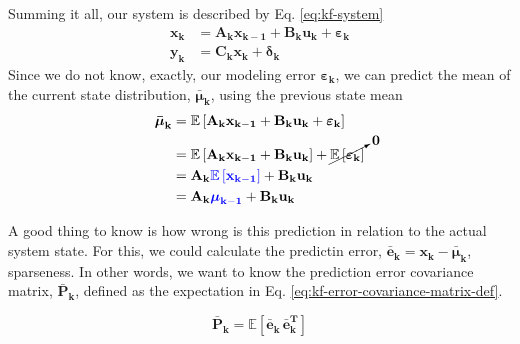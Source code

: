 \documentclass[12pt]{article}
\newcommand{\bvec}[1]{\mathbf{#1}} %
\newcommand{\bvecT}[1]{\mathbf{#1^T}} %
\newcommand{\mat}[1]{\mathbf{#1}}
\newcommand{\brac}[1]{\left[#1\right]} %
\newcommand{\mb}[1]{{\boldsymbol{#1}}} %
\newcommand{\expv}[1]{\mathbb{E}\brac{#1}} %
\newcommand{\blue}[1]{\color{blue}#1\color{black}}
\begin{document}
Summing it all, our system is described by Eq. \ref{eq:kf-system}
\begin{equation}
    \begin{aligned}
        \bvec{x_k} &= \mat{A_k}\bvec{x_{k-1}} + \mat{B_k}\bvec{u_k} + \mb{\varepsilon}_\mathbf{k}\\
        \bvec{y_k} &= \mat{C_k}\bvec{x_k} + \mb{\delta}_\mathbf{k}
    \end{aligned}
    \label{eq:kf-system}
\end{equation}
Since we do not know, exactly, our modeling error $\mb{\varepsilon}_\mathbf{k}$, we can predict the mean of the current state distribution, $\mb{\bar{\mu}}_\mathbf{k}$, using the previous state mean
\begin{equation}
    \begin{aligned}
        \mb{\bar{\mu}}_\mathbf{k} &= \expv{\mat{A_k}\bvec{x_{k-1}} + \mat{B_k}\bvec{u_k} + \mb{\varepsilon}_\mathbf{k}}\\
        & = \expv{\mat{A_k}\bvec{x_{k-1}} + \mat{B_k}\bvec{u_k}} + \cancelto{\mat{0}}{\expv{\mb{\varepsilon}_\mathbf{k}}}\\
        &= \mat{A_k}\blue{\expv{\bvec{x_{k-1}}}} + \mat{B_k}\bvec{u_k}\\
        &= \mat{A_k}\blue{\mb{\mu}_\mathbf{k-1}} + \mat{B_k}\bvec{u_k}
    \end{aligned}
    \label{eq:kf-prdiction}
\end{equation}

A good thing to know is how wrong is this prediction in relation to the actual system state. For this, we could calculate the predictin error, $\bvec{\bar{e}_k} = \bvec{x_k} - \mb{\bar{\mu}}_\mathbf{k}$, sparseness. In other words, we want to know the prediction error covariance matrix, $\mat{\bar{P}_k}$, defined as the expectation in Eq. \ref{eq:kf-error-covariance-matrix-def}.

\begin{equation}
    \mat{\bar{P}_k} = \expv{\bvec{\bar{e}_k} \, \bvecT{\bar{e}_k}}
    \label{eq:kf-error-covariance-matrix-def}
\end{equation}
\end{document}

